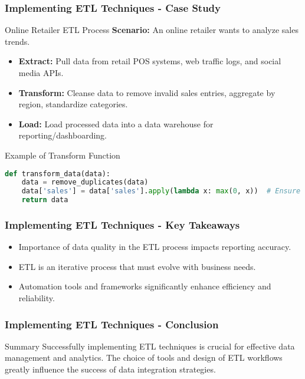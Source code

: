 \documentclass[aspectratio=169]{beamer}
\begin{document}
\begin{frame}[fragile]
    \frametitle{Implementing ETL Techniques - Case Study}
    \begin{block}{Online Retailer ETL Process}
        \textbf{Scenario:} An online retailer wants to analyze sales trends.
        \begin{itemize}
            \item \textbf{Extract:} Pull data from retail POS systems, web traffic logs, and social media APIs.
            \item \textbf{Transform:} Cleanse data to remove invalid sales entries, aggregate by region, standardize categories.
            \item \textbf{Load:} Load processed data into a data warehouse for reporting/dashboarding.
        \end{itemize}
    \end{block}

    \begin{block}{Example of Transform Function}
    \begin{lstlisting}[language=Python]
def transform_data(data):
    data = remove_duplicates(data)
    data['sales'] = data['sales'].apply(lambda x: max(0, x))  # Ensure no negative sales
    return data
    \end{lstlisting}
    \end{block}
\end{frame}

\begin{frame}[fragile]
    \frametitle{Implementing ETL Techniques - Key Takeaways}
    \begin{itemize}
        \item Importance of data quality in the ETL process impacts reporting accuracy.
        \item ETL is an iterative process that must evolve with business needs.
        \item Automation tools and frameworks significantly enhance efficiency and reliability.
    \end{itemize}
\end{frame}

\begin{frame}[fragile]
    \frametitle{Implementing ETL Techniques - Conclusion}
    \begin{block}{Summary}
        Successfully implementing ETL techniques is crucial for effective data management and analytics. The choice of tools and design of ETL workflows greatly influence the success of data integration strategies.
    \end{block}
\end{frame}
\end{document}
